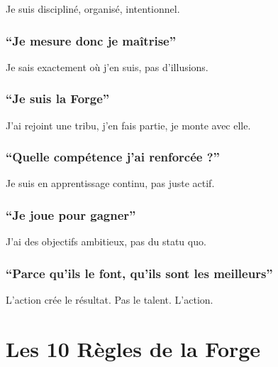 \documentclass[12pt,a4paper,openany]{book}
\begin{document}
Je suis discipliné, organisé, intentionnel.

\subsection{``Je mesure donc je maîtrise''}

Je sais exactement où j'en suis, pas d'illusions.

\subsection{``Je suis la Forge''}

J'ai rejoint une tribu, j'en fais partie, je monte avec elle.

\subsection{``Quelle compétence j'ai renforcée ?''}

Je suis en apprentissage continu, pas juste actif.

\subsection{``Je joue pour gagner''}

J'ai des objectifs ambitieux, pas du statu quo.

\subsection{``Parce qu'ils le font, qu'ils sont les meilleurs''}

L'action crée le résultat. Pas le talent. L'action.

\clearpage

\chapter{Les 10 Règles de la Forge}
\end{document}
